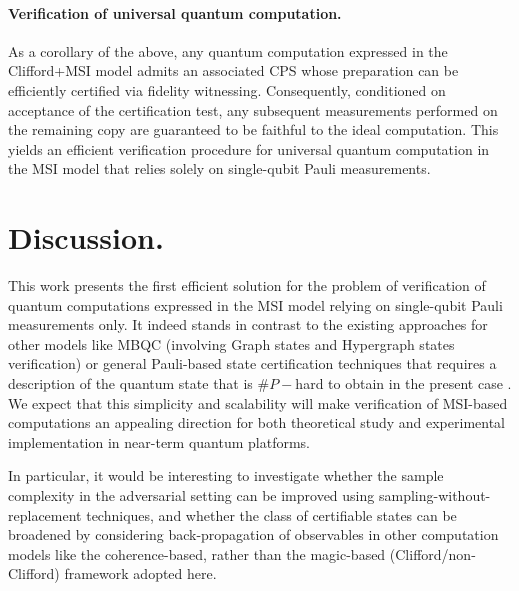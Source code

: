 \documentclass[a4paper]{article}
\begin{document}
\paragraph{Verification of universal quantum computation.}
As a corollary of the above, any quantum computation expressed in the Clifford+MSI model admits an associated CPS whose preparation can be efficiently certified via fidelity witnessing. Consequently, conditioned on acceptance of the certification test, any subsequent measurements performed on the remaining copy are guaranteed to be faithful to the ideal computation. This yields an efficient verification procedure for universal quantum computation in the MSI model that relies solely on single-qubit Pauli measurements.


\section{Discussion.}

 This work presents the first efficient solution for the problem of verification of quantum computations expressed in the MSI model relying on single-qubit Pauli measurements only. It indeed stands in contrast to the existing approaches for other models like MBQC (involving Graph states and Hypergraph states verification) or general Pauli-based state certification techniques that requires a description of the quantum state that is $\#P-$hard to obtain in the present case \cite{YJS18quantum}. 
 We expect that this simplicity and scalability will make verification of MSI-based computations an appealing direction for both theoretical study and experimental implementation in near-term quantum platforms.

In particular, it would be interesting to investigate whether the sample complexity in the adversarial setting can be improved using sampling-without-replacement techniques, and whether the class of certifiable states can be broadened by considering back-propagation of observables in other computation models like the coherence-based, rather than the magic-based (Clifford/non-Clifford) framework adopted here.

\end{document}
